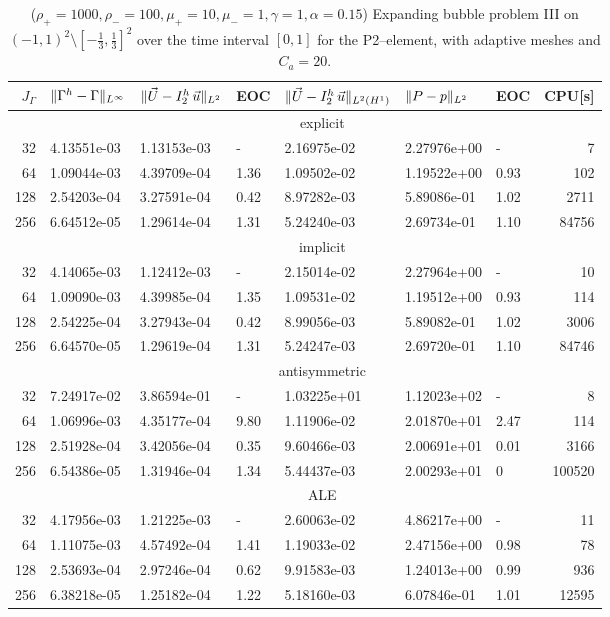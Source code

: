 \begin{table}
\center
\hspace*{-3.25cm}
\begin{tabular}{rllllllr}
\hline
$J_\Gamma$ & $\|\Gamma^h - \Gamma\|_{L^\infty}$ & $\|\vec U - I^h_{2}\,\vec u\|_{L^2}$ & EOC & $\|\vec U - I^h_{2}\,\vec u\|_{L^2(H^1)}$ & $\|P - p\|_{L^2}$ & EOC
& CPU[s] \\
\hline
& \multicolumn{7}{c}{explicit} \\
\hline
 32 & 4.13551e-03 & 1.13153e-03 &    - & 2.16975e-02 & 2.27976e+00 &    - &
7 \\
 64 & 1.09044e-03 & 4.39709e-04 & 1.36 & 1.09502e-02 & 1.19522e+00 & 0.93 &
102 \\
128 & 2.54203e-04 & 3.27591e-04 & 0.42 & 8.97282e-03 & 5.89086e-01 & 1.02 &
2711 \\
256 & 6.64512e-05 & 1.29614e-04 & 1.31 & 5.24240e-03 & 2.69734e-01 & 1.10 &
84756 \\
\hline
& \multicolumn{7}{c}{implicit} \\
\hline
 32 & 4.14065e-03 & 1.12412e-03 &    - & 2.15014e-02 & 2.27964e+00 &    - &
10 \\
 64 & 1.09090e-03 & 4.39985e-04 & 1.35 & 1.09531e-02 & 1.19512e+00 & 0.93 &
114 \\
128 & 2.54225e-04 & 3.27943e-04 & 0.42 & 8.99056e-03 & 5.89082e-01 & 1.02 &
3006 \\
256 & 6.64570e-05 & 1.29619e-04 & 1.31 & 5.24247e-03 & 2.69720e-01 & 1.10 &
84746 \\
\hline
& \multicolumn{7}{c}{antisymmetric} \\
\hline
 32 & 7.24917e-02 & 3.86594e-01 &    - & 1.03225e+01 & 1.12023e+02 &    - &
 8 \\
 64 & 1.06996e-03 & 4.35177e-04 & 9.80 & 1.11906e-02 & 2.01870e+01 & 2.47 &
114 \\
128 & 2.51928e-04 & 3.42056e-04 & 0.35 & 9.60466e-03 & 2.00691e+01 & 0.01 &
3166 \\
256 & 6.54386e-05 & 1.31946e-04 & 1.34 & 5.44437e-03 & 2.00293e+01 &    0 &
100520 \\
\hline
& \multicolumn{7}{c}{ALE} \\
\hline
 32 & 4.17956e-03 & 1.21225e-03 &    - & 2.60063e-02 & 4.86217e+00 &    - &
11 \\
 64 & 1.11075e-03 & 4.57492e-04 & 1.41 & 1.19033e-02 & 2.47156e+00 & 0.98 &
78 \\
128 & 2.53693e-04 & 2.97246e-04 & 0.62 & 9.91583e-03 & 1.24013e+00 & 0.99 &
936 \\
256 & 6.38218e-05 & 1.25182e-04 & 1.22 & 5.18160e-03 & 6.07846e-01 & 1.01 &
12595 \\
\hline
\end{tabular}
\hspace*{-3.25cm}
\caption[Navier--Stokes expanding bubble III errors P2--\pdg]
{($\rho_+ = 1000,\rho_- = 100,\mu_+ = 10,\mu_- =1,\gamma = 1,\alpha=0.15$)
Expanding bubble problem III on $(-1,1)^2\setminus[-\frac{1}{3},\frac{1}{3}]^2$
over the time interval $[0,1]$ for the P2--\pdg element, with adaptive
meshes and $C_a=20$\textdegree.}
\label{tab:nsexpandingbubbleIIIp2p1dg}
\end{table}

